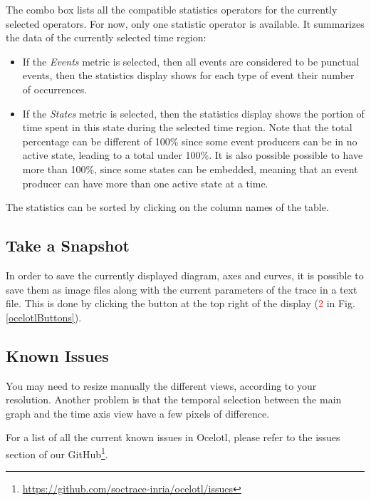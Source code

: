 \documentclass[twoside]{article}
\begin{document}
\begin{sloppypar}
The combo box lists all the compatible statistics operators for the currently selected operators. For now, only one statistic operator is available. It summarizes the data of the currently selected time region:
\begin{itemize} 
	\item If the \textit{Events} metric is selected, then all events are considered to be punctual events, then the statistics display shows for each type of event their number of occurrences.
	\item If the \textit{States} metric is selected, then the statistics display shows the portion of time spent in this state during the selected time region. Note that the total percentage can be different of 100\% since some event producers can be in no active state, leading to a total under 100\%. It is also possible possible to have more than 100\%, since some states can be embedded, meaning that an event producer can have more than one active state at a time.
\end{itemize}

The statistics can be sorted by clicking on the column names of the table.

\subsection{Take a Snapshot}
In order to save the currently displayed diagram, axes and curves, it is possible to save them as image files along with the current parameters of the trace in a text file. This is done by clicking the button at the top right of the display (\textcolor{red}{2} in Fig. \ref{ocelotlButtons}).

\subsection{Known Issues}
You may need to resize manually the different views, according to your resolution. Another problem is that the temporal selection between the main graph and the time axis view have a few pixels of difference.

For a list of all the current known issues in Ocelotl, please refer to the issues section of our GitHub\footnote{\url{https://github.com/soctrace-inria/ocelotl/issues}}.

\newpage

\newpage

{}

\end{sloppypar} 
\end{document}
